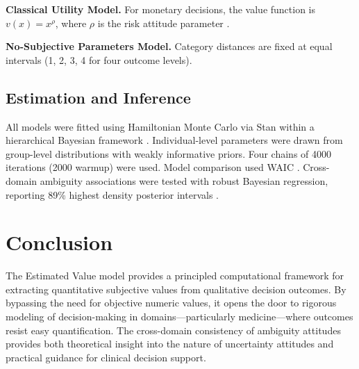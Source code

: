 \documentclass[11pt]{article}
\begin{document}
\textbf{Classical Utility Model.} For monetary decisions, the value function is $v(x) = x^\rho$, where $\rho$ is the risk attitude parameter \citep{kahneman1979prospect}.

\textbf{No-Subjective Parameters Model.} Category distances are fixed at equal intervals (1, 2, 3, 4 for four outcome levels).

\subsection{Estimation and Inference}

All models were fitted using Hamiltonian Monte Carlo via Stan \citep{carpenter2017stan} within a hierarchical Bayesian framework \citep{gelman2013bayesian}. Individual-level parameters were drawn from group-level distributions with weakly informative priors. Four chains of 4000 iterations (2000 warmup) were used. Model comparison used WAIC \citep{watanabe2010asymptotic, vehtari2017practical}. Cross-domain ambiguity associations were tested with robust Bayesian regression, reporting 89\% highest density posterior intervals \citep{kruschke2018bayesian}.

\section{Conclusion}

The Estimated Value model provides a principled computational framework for extracting quantitative subjective values from qualitative decision outcomes. By bypassing the need for objective numeric values, it opens the door to rigorous modeling of decision-making in domains---particularly medicine---where outcomes resist easy quantification. The cross-domain consistency of ambiguity attitudes provides both theoretical insight into the nature of uncertainty attitudes and practical guidance for clinical decision support.



\end{document}

